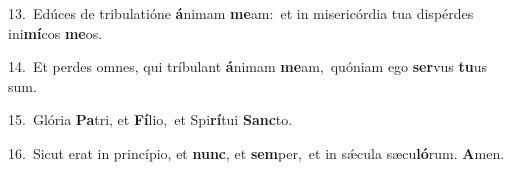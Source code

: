 {\numbfont\textcolor{\numbcolor}{13.}}~Edúces de tribulatióne \textbf{á}\-nimam \textbf{me}\-am:~\star et in misericórdia tua dispérdes ini\-\textbf{mí}\-cos \textbf{me}\-os.\par
{\numbfont\textcolor{\numbcolor}{14.}}~Et perdes omnes, qui tríbulant \textbf{á}\-nimam \textbf{me}\-am,~\star quóniam ego \textbf{ser}\-vus \textbf{tu}\-us sum.\par
{\numbfont\textcolor{\numbcolor}{15.}}~Glória \textbf{Pa}\-tri, et \textbf{Fí}\-lio,~\star et Spi\-\textbf{rí}\-tui \textbf{Sanc}\-to.\par
{\numbfont\textcolor{\numbcolor}{16.}}~Sicut erat in princípio, et \textbf{nunc}\-, et \textbf{sem}\-per,~\star et in sǽcula sæcu\-\textbf{ló}\-rum. \textbf{A}\-men.\par
